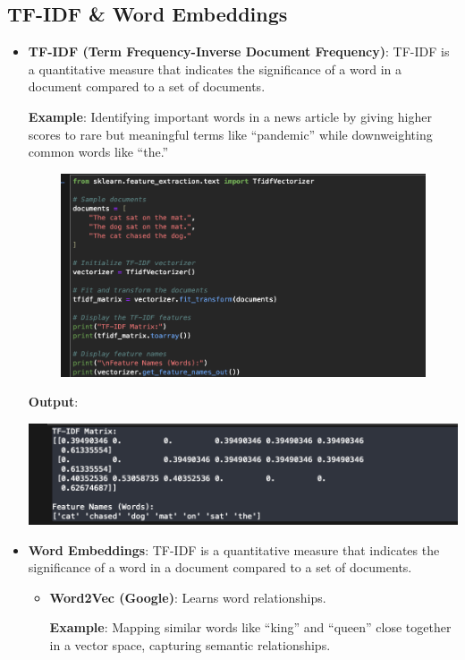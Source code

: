 \documentclass{article}
\begin{document}
\subsection{TF-IDF \& Word Embeddings}
\begin{itemize}
   \item \textbf{TF-IDF (Term Frequency-Inverse Document Frequency)}: TF-IDF is a quantitative measure that indicates the significance of a word in a document compared to a set of documents.

   \textbf{Example}: Identifying important words in a news article by giving higher scores to rare but meaningful terms like “pandemic” while downweighting common words like “the.”

   \includegraphics[width=14cm,height=6cm]{TF-IDF.png}

\textbf{Output}:

\includegraphics[width=14cm,height=4
cm]{TF-IDF_Output.png}
    \item \textbf{Word Embeddings}: TF-IDF is a quantitative measure that indicates the significance of a word in a document compared to a set of documents.
    \begin{itemize}
    \item \textbf{Word2Vec (Google)}: Learns word relationships.

    \textbf{Example}: Mapping similar words like “king” and “queen” close together in a vector space, capturing semantic relationships.


\end{itemize}
\end{itemize}
\end{document}
